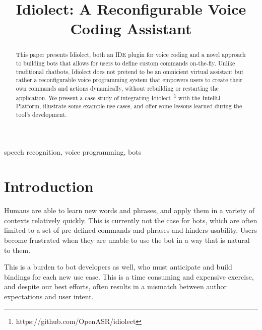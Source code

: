 \documentclass[conference]{IEEEtran}
\begin{document}
\title{Idiolect: A Reconfigurable Voice Coding Assistant}

\author{
\and
{}
\and
{}
\and
{}
}

\maketitle

\begin{abstract}
This paper presents Idiolect, both an IDE plugin for voice coding and a novel approach to building bots that allows for users to define custom commands on-the-fly. Unlike traditional chatbots, Idiolect does not pretend to be an omnicient virtual assistant but rather a reconfigurable voice programming system that empowers users to create their own commands and actions dynamically, without rebuilding or restarting the application. We present a case study of integrating Idiolect~\footnote{https://github.com/OpenASR/idiolect} with the IntelliJ Platform, illustrate some example use cases, and offer some lessons learned during the tool's development.
\end{abstract}

\begin{IEEEkeywords}
    speech recognition, voice programming, bots
\end{IEEEkeywords}

\section{Introduction}

Humans are able to learn new words and phrases, and apply them in a variety of contexts relatively quickly. This is currently not the case for bots, which are often limited to a set of pre-defined commands and phrases and hinders usability. Users become frustrated when they are unable to use the bot in a way that is natural to them.

This is a burden to bot developers as well, who must anticipate and build bindings for each new use case. This is a time consuming and expensive exercise, and despite our best efforts, often results in a mismatch between author expectations and user intent.
\end{document}
